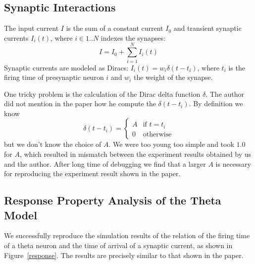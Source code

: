 \subsection{Synaptic Interactions}

The input current $I$ is the sum of a constant current $I_0$ and transient synaptic currents $I_i(t)$, 
where $i \in 1..N$ indexes the synapses:
\begin{equation}
	I = I_0 + \sum_{i=1}^N I_i(t)
\end{equation}
Synaptic currents are modeled as Diracs: $I_i(t) = w_i\delta(t - t_i)$,
where $t_i$ is the firing time of presynaptic neuron $i$ and $w_i$ the weight of the synapse.

One tricky problem is the calculation of the Dirac delta function $\delta$. 
The author did not mention in the paper how he compute the $\delta(t-t_i)$.
By definition we know %
\begin{equation}
\label{dirac}
\delta(t-t_i) = \left\{ \begin{array}{ll}
 A & \textrm{if $t = t_i$}\\
 0 & \textrm{otherwise}
  \end{array} \right.
\end{equation}
but we don't know the choice of $A$.
We were too young too simple and took $1.0$ for $A$, which resulted in mismatch between
the experiment results obtained by us and the author. 
After long time of debugging we find that a larger $A$ is necessary for reproducing the experiment result shown in
the paper.

\subsection{Response Property Analysis of the Theta Model}

We successfully reproduce the simulation results of the relation of the firing time of a theta neuron and the time of arrival of a synaptic current, as shown in Figure~\ref{response}. The results are precisely similar to that shown in the paper.


